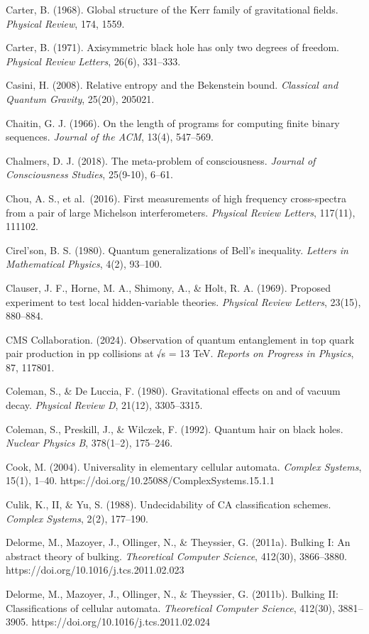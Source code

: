 \documentclass[
]{article}
\begin{document}
Carter, B. (1968). Global structure of the Kerr family of gravitational
fields. \emph{Physical Review}, 174, 1559.

Carter, B. (1971). Axisymmetric black hole has only two degrees of
freedom. \emph{Physical Review Letters}, 26(6), 331--333.

Casini, H. (2008). Relative entropy and the Bekenstein bound.
\emph{Classical and Quantum Gravity}, 25(20), 205021.

Chaitin, G. J. (1966). On the length of programs for computing finite
binary sequences. \emph{Journal of the ACM}, 13(4), 547--569.

Chalmers, D. J. (2018). The meta-problem of consciousness. \emph{Journal
of Consciousness Studies}, 25(9-10), 6--61.

Chou, A. S., et al.~(2016). First measurements of high frequency
cross-spectra from a pair of large Michelson interferometers.
\emph{Physical Review Letters}, 117(11), 111102.

Cirel'son, B. S. (1980). Quantum generalizations of Bell's inequality.
\emph{Letters in Mathematical Physics}, 4(2), 93--100.

Clauser, J. F., Horne, M. A., Shimony, A., \& Holt, R. A. (1969).
Proposed experiment to test local hidden-variable theories.
\emph{Physical Review Letters}, 23(15), 880--884.

CMS Collaboration. (2024). Observation of quantum entanglement in top
quark pair production in pp collisions at √s = 13 TeV. \emph{Reports on
Progress in Physics}, 87, 117801.

Coleman, S., \& De Luccia, F. (1980). Gravitational effects on and of
vacuum decay. \emph{Physical Review D}, 21(12), 3305--3315.

Coleman, S., Preskill, J., \& Wilczek, F. (1992). Quantum hair on black
holes. \emph{Nuclear Physics B}, 378(1--2), 175--246.

Cook, M. (2004). Universality in elementary cellular automata.
\emph{Complex Systems}, 15(1), 1--40.
https://doi.org/10.25088/ComplexSystems.15.1.1

Culik, K., II, \& Yu, S. (1988). Undecidability of CA classification
schemes. \emph{Complex Systems}, 2(2), 177--190.

Delorme, M., Mazoyer, J., Ollinger, N., \& Theyssier, G. (2011a).
Bulking I: An abstract theory of bulking. \emph{Theoretical Computer
Science}, 412(30), 3866--3880. https://doi.org/10.1016/j.tcs.2011.02.023

Delorme, M., Mazoyer, J., Ollinger, N., \& Theyssier, G. (2011b).
Bulking II: Classifications of cellular automata. \emph{Theoretical
Computer Science}, 412(30), 3881--3905.
https://doi.org/10.1016/j.tcs.2011.02.024
\end{document}
